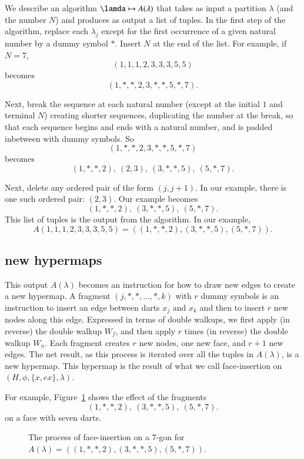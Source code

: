 We describe an algorithm $\lamda\mapsto A(\lambda)$ that takes
as input a partition $\lambda$ (and the number $N$)
and produces as output a list of
tuples.
In the first step of the algorithm,
replace each $\lambda_j$ except for the
first occurrence of a given natural number by a dummy symbol $*$.
Insert $N$ at the end of the list. For example, if $N=7$,
    $$(1,1,1,2,3,3,3,5,5)$$ becomes
    $$(1,*,*,2,3,*,*,5,*,7).$$

Next, break the sequence at each natural number (except at the initial $1$
and terminal $N$)
creating shorter sequences, duplicating the number at the break,
so that each sequence begins and ends with a natural number,
and is padded inbetween with dummy symbols. So
    $$(1,*,*,2,3,*,*,5,*,7)$$ becomes
$$(1,*,*,2),\ (2,3),\ (3,*,*,5),\ (5,*,7).$$

Next,
delete any ordered pair of the form $(j,j+1)$. In our example, there
is one such ordered pair: $(2,3)$.  Our example becomes
  $$
  (1,*,*,2),\  (3,*,*,5),\ (5,*,7).
  $$
This list of tuples is the output from the algorithm.
In our example,
  $$A(1,1,1,2,3,3,3,5,5) = ((1,*,*,2),(3,*,*,5),(5,*,7)).$$



\subsection{new hypermaps}

This output $A(\lambda)$
becomes an instruction for how to draw new edges to create a
new hypermap. A fragment $(j,*,*,\ldots,*,k)$ with $r$ dummy symbols
is an instruction to insert an edge between darts $x_j$ and $x_k$
and then to insert $r$ new nodes along this edge.
Expressed in terms of double walkups, we first apply (in
reverse) the double walkup $W_f$, and then apply $r$ times (in
reverse) the double walkup $W_n$.  Each fragment creates $r$ new
nodes, one new face, and $r+1$ new edges.  The net result, as this process is
iterated over all the tuples in $A(\lambda)$, is a new hypermap. 
This hypermap is the result of what we call face-insertion
on $(H,\phi,\{x,e x\},\lambda)$.

For example, Figure~\ref{fig:7darts} shows the effect of the fragments
$$(1,*,*,2),\ (3,*,*,5),\ (5,*,7).
  $$ on a face with seven darts.


\begin{figure}[htb]
  \centering
  \caption{The process of face-insertion on a $7$-gon for
   $A(\lambda) = ((1,*,*,2),(3,*,*,5),(5,*,7))$.}
  \label{fig:7darts}
\end{figure}

